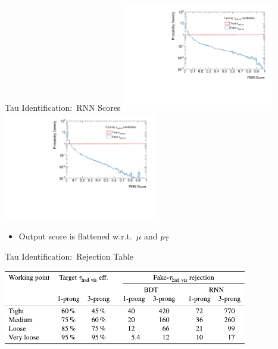 \documentclass[11pt, xcolor={dvipsnames}, aspectratio=169]{beamer}
\begin{document}

\begin{frame}{Tau Identification:\ RNN Scores}
  \includegraphics[width=0.5\textwidth]{tauid/rnnscore_1p}%
  \includegraphics[width=0.5\textwidth]{tauid/rnnscore_3p}

  \begin{itemize}
  \item Output score is flattened w.r.t.\ $\mu$ and \tauhadvis $p_{\text{T}}$
  \end{itemize}
\end{frame}


\begin{frame}{Tau Identification:\ Rejection Table}
  \centering

  \includegraphics[width=0.8\textwidth]{backup/tauid_rejection}
\end{frame}

\end{document}
